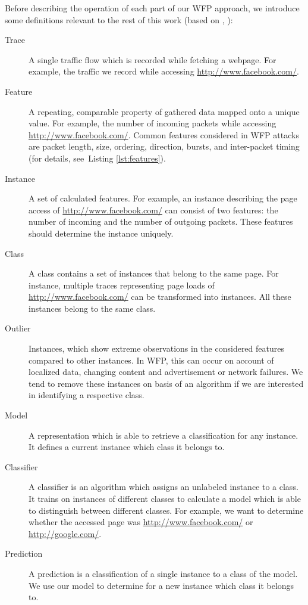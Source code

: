 Before describing the operation of each part of our \ac{WFP} approach, we introduce some definitions relevant to the rest of this work (based on \cite{Landa2013}, \cite{Pennekamp2014}):
\begin{description}
\item[Trace] A single traffic flow which is recorded while fetching a webpage. For example, the traffic we record while accessing \url{http://www.facebook.com/}.
\item[Feature] A repeating, comparable property of gathered data mapped onto a unique value. For example, the number of incoming packets while accessing \url{http://www.facebook.com/}. Common features considered in \ac{WFP} attacks are packet length, size, ordering, direction, bursts, and inter-packet timing (for details, see~Listing \ref{lst:features}).
\item[Instance] A set of calculated features. For example, an instance describing the page access of \url{http://www.facebook.com/} can consist of two features: the number of incoming and the number of outgoing packets. These features should determine the instance uniquely.
\item[Class] A class contains a set of instances that belong to the same page. For instance, multiple traces representing page loads of \url{http://www.facebook.com/} can be transformed into instances. All these instances belong to the same class.
\item[Outlier] Instances, which show extreme observations in the considered features compared to other instances. In \ac{WFP}, this can occur on account of localized data, changing content and advertisement or network failures. We tend to remove these instances on basis of an algorithm if we are interested in identifying a respective class.
\item[Model] A representation which is able to retrieve a classification for any instance. It defines a current instance which class it belongs to.
\item[Classifier] A classifier is an algorithm which assigns an unlabeled instance to a class. It trains on instances of different classes to calculate a model which is able to distinguish between different classes. For example, we want to determine whether the accessed page was \url{http://www.facebook.com/} or \url{http://google.com/}.
\item[Prediction] A prediction is a classification of a single instance to a class of the model. We use our model to determine for a new instance which class it belongs to.

\end{description}
